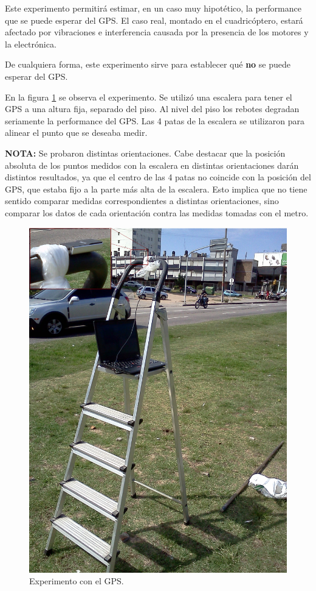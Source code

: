 \documentclass[spanish,12pt,a4paper,titlepage]{report}
\begin{document}
Este experimento permitirá estimar, en un caso muy hipotético, la performance que se puede esperar del GPS. El caso real, montado en el cuadricóptero, estará afectado por vibraciones e interferencia causada por la presencia de los motores y la electrónica.

De cualquiera forma, este experimento sirve para establecer qué \textbf{no} se puede esperar del GPS.

En la figura \ref{fig:gps_setup.png} se observa el experimento. Se utilizó una escalera para tener el GPS a una altura fija, separado del piso. Al nivel del piso los rebotes degradan seriamente la performance del GPS. Las 4 patas de la escalera se utilizaron para alinear el punto que se deseaba medir.

\textbf{NOTA:} Se probaron distintas orientaciones. Cabe destacar que la posición absoluta de los puntos medidos con la escalera en distintas orientaciones darán distintos resultados, ya que el centro de las 4 patas no coincide con la posición del GPS, que estaba fijo a la parte más alta de la escalera. Esto implica que no tiene sentido comparar medidas correspondientes a distintas orientaciones, sino comparar los datos de cada orientación contra las medidas tomadas con el metro.

\begin{figure}[h!]
  \begin{center}
  \includegraphics[width=.7\textwidth]{./img/gps_setup.png}
  \end{center}
  \caption{Experimento con el GPS.}
  \label{fig:gps_setup.png}
\end{figure}
\end{document}
